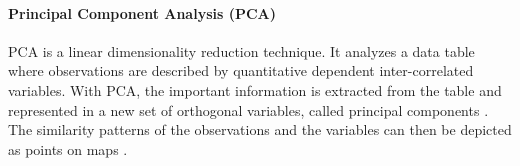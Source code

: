 \documentclass[conference]{IEEEtran}
\begin{document}





\paragraph{Principal Component Analysis (PCA)} PCA is a linear dimensionality reduction technique. It analyzes a data table where observations are described by quantitative dependent inter-correlated variables. With PCA, the important information is extracted from the table and represented in a new set of orthogonal variables, called principal components \cite{bro2014principal}. The similarity patterns of the observations and the variables can then be depicted as points on maps \cite{abdi2010principal}.
\end{document}
